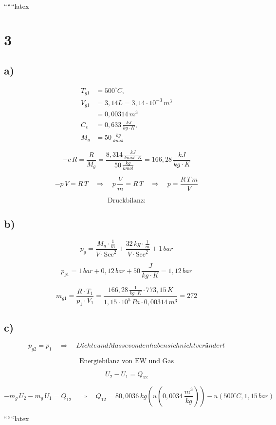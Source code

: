 
``````latex


\section*{3}

\subsection*{a)}
\begin{align*}
    T_{g1} &= 500^\circ C, \\
    V_{g1} &= 3,14L = 3,14 \cdot 10^{-3} \, m^3 \\
    &= 0,00314 \, m^3 \\
    C_v &= 0,633 \, \frac{kJ}{kg \cdot K}, \\
    M_{g} &= 50 \, \frac{kg}{kmol}
\end{align*}

\[
-c \, R = \frac{R}{M_g} = \frac{8,314 \, \frac{kJ}{kmol \cdot K}}{50 \, \frac{kg}{kmol}} = 166,28 \, \frac{kJ}{kg \cdot K}
\]

\[
-p \, V = R \, T \quad \Rightarrow \quad p \, \frac{V}{m} = R \, T \quad \Rightarrow \quad p = \frac{R \, T \, m}{V}
\]

\[
\text{Druckbilanz:}
\]

\subsection*{b)}
\[
p_{g} = \frac{M_{g} \cdot \frac{1}{m}}{V \cdot \text{Sec}^2} + \frac{32 \, kg \cdot \frac{1}{m}}{V \cdot \text{Sec}^2} + 1 \, bar
\]

\[
p_{g1} = 1 \, bar + 0,12 \, bar + 50 \, \frac{J}{kg \cdot K} = 1,12 \, bar
\]

\[
m_{g1} = \frac{R \cdot T_1}{p_1 \cdot V_1} = \frac{166,28 \, \frac{1}{kg \cdot K} \cdot 773,15 \, K}{1,15 \cdot 10^5 \, Pa \cdot 0,00314 \, m^3} = 272
\]

\subsection*{c)}
\[
p_{g2} = p_1 \quad \Rightarrow \quad Dichte und Masse von den haben sich nicht verändert
\]

\[
\text{Energiebilanz von EW und Gas}
\]

\[
U_2 - U_1 = Q_{12}
\]

\[
-m_g \, U_2 - m_g \, U_1 = Q_{12} \quad \Rightarrow \quad Q_{12} = 80,0036 \, kg \left( u(0,0034 \, \frac{m^3}{kg}) \right) - u(500^\circ C, 1,15 \, bar)
\]

``````latex


